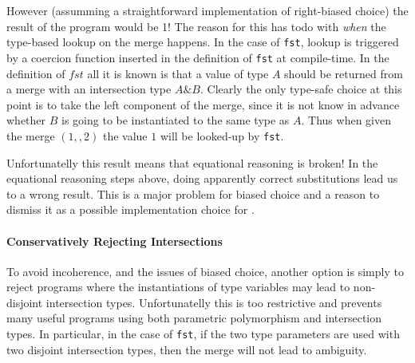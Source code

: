 However (assumming a straightforward implementation of right-biased
choice) the result of the program would be 1! The reason for this has
todo with \emph{when} the type-based lookup on the merge
happens. In the case of \lstinline{fst}, lookup is triggered by 
a coercion function inserted in the definition of
\lstinline{fst} at compile-time. In the definition of $fst$ 
all it is known is that a value of type $A$ should be
returned from a merge with an intersection type $A\&B$. 
Clearly the only type-safe choice at this point is to take the left component 
of the merge, since it is not know in advance whether $B$ is going to 
be instantiated to the same type as $A$.  Thus when given the merge 
$(1,,2)$ the value $1$ will be looked-up by \lstinline{fst}.

Unfortunatelly this result means that equational reasoning is broken!
In the equational reasoning steps above, doing apparently correct
substitutions lead us to a wrong result. This is a major problem for
biased choice and a reason to dismiss it as a possible implementation
choice for \name.

\paragraph{Conservatively Rejecting Intersections}
To avoid incoherence, and the issues of biased choice, another option 
is simply to reject programs where the
instantiations of type variables may lead to non-disjoint intersection
types. Unfortunatelly this is too restrictive and prevents many useful
programs using both parametric polymorphism and intersection types.
In particular, in the case of \lstinline{fst}, if the two type
parameters are used with two disjoint intersection
types, then the merge will not lead to ambiguity. 


